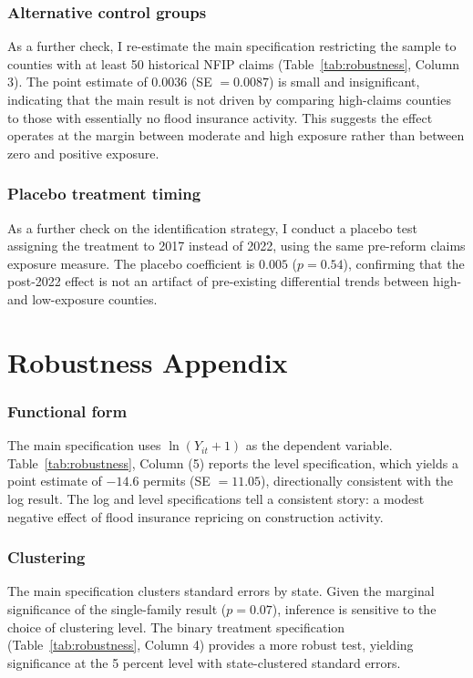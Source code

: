 \documentclass[12pt]{article}
\begin{document}
\subsubsection*{Alternative control groups} As a further check, I re-estimate the main specification restricting the sample to counties with at least 50 historical NFIP claims (Table~\ref{tab:robustness}, Column 3). The point estimate of $0.0036$ (SE $= 0.0087$) is small and insignificant, indicating that the main result is not driven by comparing high-claims counties to those with essentially no flood insurance activity. This suggests the effect operates at the margin between moderate and high exposure rather than between zero and positive exposure.

\subsubsection*{Placebo treatment timing} As a further check on the identification strategy, I conduct a placebo test assigning the treatment to 2017 instead of 2022, using the same pre-reform claims exposure measure. The placebo coefficient is $0.005$ ($p = 0.54$), confirming that the post-2022 effect is not an artifact of pre-existing differential trends between high- and low-exposure counties.


\section{Robustness Appendix}
\label{sec:app_robust}

\subsubsection*{Functional form} The main specification uses $\ln(Y_{it} + 1)$ as the dependent variable. Table~\ref{tab:robustness}, Column (5) reports the level specification, which yields a point estimate of $-14.6$ permits (SE $= 11.05$), directionally consistent with the log result. The log and level specifications tell a consistent story: a modest negative effect of flood insurance repricing on construction activity.

\subsubsection*{Clustering} The main specification clusters standard errors by state. Given the marginal significance of the single-family result ($p = 0.07$), inference is sensitive to the choice of clustering level. The binary treatment specification (Table~\ref{tab:robustness}, Column 4) provides a more robust test, yielding significance at the 5 percent level with state-clustered standard errors.
\end{document}
